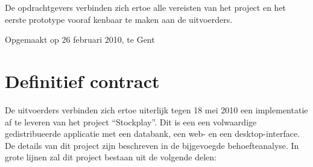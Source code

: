 De opdrachtgevers verbinden zich ertoe alle vereisten van het project en het eerste prototype vooraf kenbaar te maken aan de uitvoerders.

Opgemaakt op 26 februari 2010, te Gent


%
%

\section{Definitief contract}

De uitvoerders verbinden zich ertoe uiterlijk tegen 18 mei 2010 een implementatie af te leveren van het project ``Stockplay''. Dit is een een volwaardige gedistribueerde applicatie met een databank, een web- en een desktop-interface. De details van dit project zijn beschreven in de bijgevoegde behoefteanalyse. In grote lijnen zal dit project bestaan uit de volgende delen:
